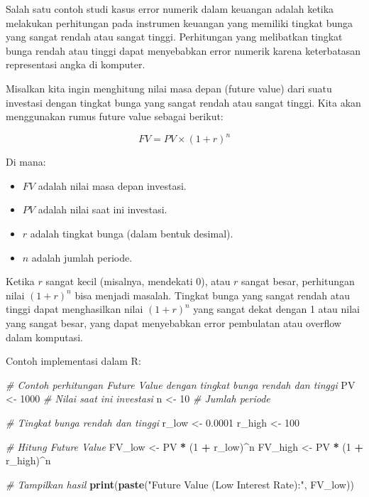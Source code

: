 \documentclass[
]{book}
\newenvironment{Shaded}{\begin{snugshade}}{\end{snugshade}}
\newcommand{\CommentTok}[1]{\textcolor[rgb]{0.56,0.35,0.01}{\textit{#1}}}
\newcommand{\DecValTok}[1]{\textcolor[rgb]{0.00,0.00,0.81}{#1}}
\newcommand{\FloatTok}[1]{\textcolor[rgb]{0.00,0.00,0.81}{#1}}
\newcommand{\FunctionTok}[1]{\textcolor[rgb]{0.13,0.29,0.53}{\textbf{#1}}}
\newcommand{\NormalTok}[1]{#1}
\newcommand{\OtherTok}[1]{\textcolor[rgb]{0.56,0.35,0.01}{#1}}
\newcommand{\SpecialCharTok}[1]{\textcolor[rgb]{0.81,0.36,0.00}{\textbf{#1}}}
\newcommand{\StringTok}[1]{\textcolor[rgb]{0.31,0.60,0.02}{#1}}
\providecommand{\tightlist}{%
  \setlength{\itemsep}{0pt}\setlength{\parskip}{0pt}}
\theoremstyle{definition}
\theoremstyle{definition}
\theoremstyle{definition}
\theoremstyle{definition}
\theoremstyle{remark}
\begin{document}
Salah satu contoh studi kasus error numerik dalam keuangan adalah ketika melakukan perhitungan pada instrumen keuangan yang memiliki tingkat bunga yang sangat rendah atau sangat tinggi. Perhitungan yang melibatkan tingkat bunga rendah atau tinggi dapat menyebabkan error numerik karena keterbatasan representasi angka di komputer.

Misalkan kita ingin menghitung nilai masa depan (future value) dari suatu investasi dengan tingkat bunga yang sangat rendah atau sangat tinggi. Kita akan menggunakan rumus future value sebagai berikut:

\[FV=PV×(1+r)^n\]

Di mana:

\begin{itemize}
\tightlist
\item
  \(FV\) adalah nilai masa depan investasi.
\item
  \(PV\) adalah nilai saat ini investasi.
\item
  \(r\) adalah tingkat bunga (dalam bentuk desimal).
\item
  \(n\) adalah jumlah periode.
\end{itemize}

Ketika \(r\) sangat kecil (misalnya, mendekati 0), atau \(r\) sangat besar, perhitungan nilai \((1+r)^n\) bisa menjadi masalah. Tingkat bunga yang sangat rendah atau tinggi dapat menghasilkan nilai \((1+r)^n\) yang sangat dekat dengan 1 atau nilai yang sangat besar, yang dapat menyebabkan error pembulatan atau overflow dalam komputasi.

Contoh implementasi dalam R:

\begin{Shaded}
\begin{Highlighting}[]
\CommentTok{\# Contoh perhitungan Future Value dengan tingkat bunga rendah dan tinggi}
\NormalTok{PV }\OtherTok{\textless{}{-}} \DecValTok{1000}  \CommentTok{\# Nilai saat ini investasi}
\NormalTok{n }\OtherTok{\textless{}{-}} \DecValTok{10}     \CommentTok{\# Jumlah periode}

\CommentTok{\# Tingkat bunga rendah dan tinggi}
\NormalTok{r\_low }\OtherTok{\textless{}{-}} \FloatTok{0.0001}
\NormalTok{r\_high }\OtherTok{\textless{}{-}} \DecValTok{100}

\CommentTok{\# Hitung Future Value}
\NormalTok{FV\_low }\OtherTok{\textless{}{-}}\NormalTok{ PV }\SpecialCharTok{*}\NormalTok{ (}\DecValTok{1} \SpecialCharTok{+}\NormalTok{ r\_low)}\SpecialCharTok{\^{}}\NormalTok{n}
\NormalTok{FV\_high }\OtherTok{\textless{}{-}}\NormalTok{ PV }\SpecialCharTok{*}\NormalTok{ (}\DecValTok{1} \SpecialCharTok{+}\NormalTok{ r\_high)}\SpecialCharTok{\^{}}\NormalTok{n}

\CommentTok{\# Tampilkan hasil}
\FunctionTok{print}\NormalTok{(}\FunctionTok{paste}\NormalTok{(}\StringTok{"Future Value (Low Interest Rate):"}\NormalTok{, FV\_low))}
\end{Highlighting}
\end{Shaded}
\end{document}
